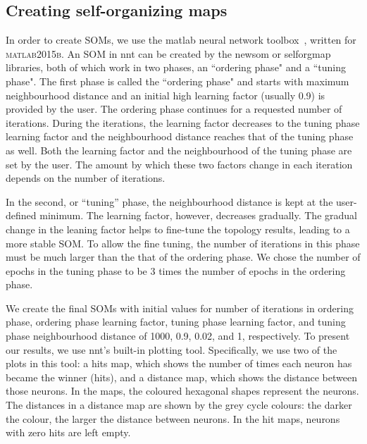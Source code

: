 \subsection{Creating self-organizing maps}
\label{sec: create_som}
     In order to create SOMs, we use the {\sc matlab} neural network toolbox~\citep[NNT,][]{matlabtolbox}, written for \textsc{matlab2015b}. 
     An SOM in {\sc nnt} can be created by the {\sc newsom} or {\sc selforgmap} libraries, both of which work in two phases, an ``ordering phase" and a ``tuning phase". 
     The first phase is called the ``ordering phase" and
     starts with maximum neighbourhood distance and an initial high learning factor (usually 0.9) is provided by the user. 
     The ordering phase continues for a requested number of iterations.
     During the iterations, the learning factor decreases to the tuning phase learning factor and the neighbourhood distance reaches that of the tuning phase as well.
     Both the learning factor and the neighbourhood of the tuning phase are set by the user. 
     The amount by which these two factors change in each iteration depends on the number of iterations.
     
     In the second, or ``tuning'' phase,
     the neighbourhood distance is kept at the user-defined minimum.
     The learning factor, however, decreases gradually.
     The gradual change in the leaning factor helps to fine-tune the topology results, leading to a more stable SOM. 
     To allow the fine tuning, the number of iterations in this phase must be much larger than the that of the ordering phase. 
     We chose the number of epochs in the tuning phase to be 3 times the number of epochs in the ordering phase.
     
     We create the final SOMs with initial values for number of iterations in ordering phase, ordering phase learning factor, tuning phase learning factor, and tuning phase neighbourhood distance of 1000, 0.9, 0.02, and 1, respectively. 
     To present our results, we use {\sc nnt}'s built-in plotting tool.
     Specifically, we use two of the plots in this tool: a hits map, which shows the number of times each neuron has became the winner (hits), and a distance map, which shows the distance between those neurons.
     In the maps, the coloured hexagonal shapes represent the neurons. 
     The distances in a distance map are shown by the grey cycle colours:
     the darker the colour, the larger the distance between neurons.
     In the hit maps, neurons with zero hits are left empty.
     
